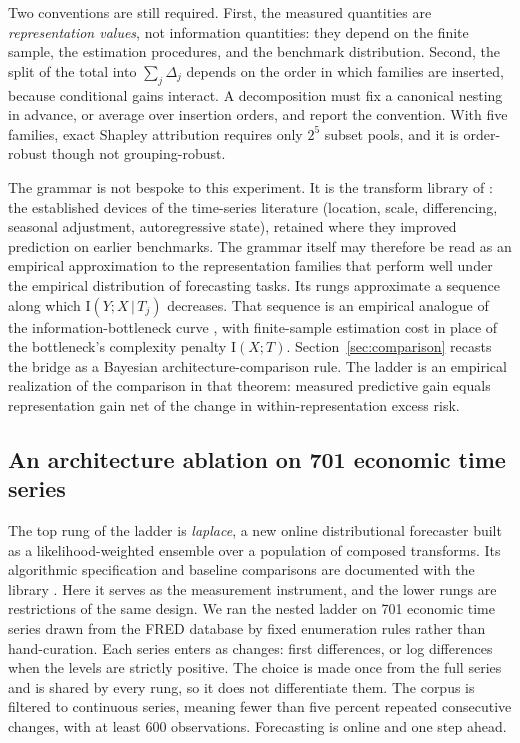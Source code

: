 \documentclass[11pt]{article}
\theoremstyle{remark}
\newcommand{\I}{\mathrm{I}}
\newcommand{\given}{\,|\,}
\begin{document}
Two conventions are still required. First, the measured quantities are \emph{representation
values}, not information quantities: they depend on the finite sample, the estimation
procedures, and the benchmark distribution. Second, the split of the total into $\sum_j\Delta_j$ depends on the order in which families
are inserted, because conditional gains interact. A decomposition must fix a canonical
nesting in advance, or average over insertion orders, and report the convention. With five
families, exact Shapley attribution requires only $2^5$ subset pools, and it is order-robust
though not grouping-robust.

The grammar is not bespoke to this experiment. It is the transform library of
\citet{cotton_skaters}: the established devices of the time-series literature (location,
scale, differencing, seasonal adjustment, autoregressive state), retained where they improved
prediction on earlier benchmarks. The grammar itself may therefore be read as an empirical approximation to the representation families that perform well under
the empirical distribution of forecasting tasks. Its rungs approximate a sequence along which
$\I(Y;X\given T_j)$ decreases. That sequence is an empirical analogue of the
information-bottleneck curve \citep{tishby1999information}, with finite-sample estimation
cost in place of the bottleneck's complexity penalty $\I(X;T)$.
Section~\ref{sec:comparison} recasts the bridge as a Bayesian architecture-comparison rule.
The ladder is an empirical realization of the comparison in that theorem: measured predictive
gain equals representation gain net of the change in within-representation excess risk.

\subsection{An architecture ablation on 701 economic time series}\label{sec:ablation}

The top rung of the ladder is \emph{laplace}, a new online distributional forecaster built
as a likelihood-weighted ensemble over a population of composed transforms. Its algorithmic
specification and baseline comparisons are documented with the library
\citep{cotton_skaters}. Here it serves as the measurement instrument, and the lower rungs
are restrictions of the same design. We ran the nested ladder on 701 economic time series
drawn from the FRED database by fixed enumeration rules rather than hand-curation. Each series enters as changes: first differences, or log differences when the levels are
strictly positive. The choice is made once from the full series and is shared by every rung,
so it does not differentiate them. The corpus is filtered to continuous series, meaning fewer than five percent
repeated consecutive changes, with at least 600 observations. Forecasting is online and one
step ahead.
\end{document}
